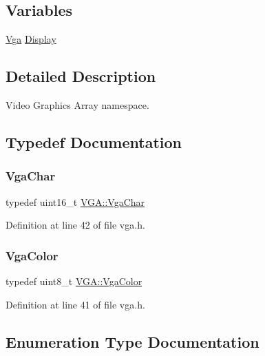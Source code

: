 \subsection*{Variables}
\begin{DoxyCompactItemize}
\item 
\hyperlink{class_v_g_a_1_1_vga}{Vga} \hyperlink{namespace_v_g_a_a97690b6d72f447f3e5e1b744af8f47fe}{Display}
\end{DoxyCompactItemize}


\subsection{Detailed Description}
Video Graphics Array namespace. 

\subsection{Typedef Documentation}
\mbox{\label{namespace_v_g_a_adb876ce4a116e09f39708ca16ef25f74}} 
\subsubsection{\texorpdfstring{Vga\+Char}{VgaChar}}
{\footnotesize\ttfamily typedef uint16\+\_\+t \hyperlink{namespace_v_g_a_adb876ce4a116e09f39708ca16ef25f74}{V\+G\+A\+::\+Vga\+Char}}



Definition at line 42 of file vga.\+h.

\mbox{\label{namespace_v_g_a_afa3882cddefd08a3f33aaf6fcbcbcd7f}} 
\subsubsection{\texorpdfstring{Vga\+Color}{VgaColor}}
{\footnotesize\ttfamily typedef uint8\+\_\+t \hyperlink{namespace_v_g_a_afa3882cddefd08a3f33aaf6fcbcbcd7f}{V\+G\+A\+::\+Vga\+Color}}



Definition at line 41 of file vga.\+h.



\subsection{Enumeration Type Documentation}
\mbox{\label{namespace_v_g_a_ace1c3156a8d3975ff783ff7a1fa8eb71}} 
